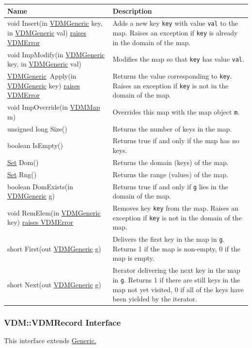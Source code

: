 \documentclass[\pformat,12pt]{article}
\newcommand{\pbs}[1]{\let\temp=\\#1\let\\=\temp}
\newenvironment{interfacetable}{%
  \begin{longtable}{|>{\pbs\raggedright\ttfamily}p{6.6cm}%
                    |>{\pbs\raggedright}p{6.6cm}|} \hline
  \textrm{\bfseries Name} &  \textbf{Description} \\ \hline
  \endhead
  }{\end{longtable}}
\newcommand{\VDMError}{\hyperlink{exception.VDMError}{raises VDMError}}
\newcommand{\VDMGeneric}{\hyperlink{interface.Generic}{VDMGeneric}}
\newcommand{\VDMMap}{\hyperlink{interface.VDMMap}{VDMMap}}
\newcommand{\Set}{\hyperlink{interface.VDMSet}{Set}}
\begin{document}
\begin{interfacetable}
void Insert(in {\VDMGeneric} key, in {\VDMGeneric} val) {\VDMError}
  & Adds a new key \texttt{key} with value \texttt{val} to the
    map. Raises an exception if \texttt{key} is already in the domain
    of the map.
\\ \hline
void ImpModify(in {\VDMGeneric} key, in {\VDMGeneric} val)
  & Modifies the map so that \texttt{key} has value \texttt{val}. 
\\ \hline
{\VDMGeneric}\ Apply(in {\VDMGeneric} key) {\VDMError}
  & Returns the value corresponding to \texttt{key}. Raises an
    exception if \texttt{key} is not in the domain of the map.
\\ \hline
void ImpOverride(in {\VDMMap} m)
  & Overrides this map with the map object \texttt{m}.
\\ \hline
unsigned long Size()
  & Returns the number of keys in the map.
\\ \hline
boolean IsEmpty()
  & Returns true if and only if the map has no keys.
\\ \hline
{\Set} Dom()
  & Returns the domain (keys) of the map.
\\ \hline
{\Set} Rng()
  & Returns the range (values) of the map.
\\ \hline
boolean DomExists(in {\VDMGeneric} g)
  & Returns true if and only if \texttt{g} lies in the domain of the
    map.
\\ \hline
void RemElem(in {\VDMGeneric} key) {\VDMError}
  & Removes key \texttt{key} from the map. Raises an exception if
    \texttt{key} is not in the domain of the map.
\\ \hline
short First(out {\VDMGeneric} g)
  & Delivers the first key in the map in \texttt{g}. Returns 1 if the
    map is non-empty, 0 if the map is empty. 
\\ \hline
short Next(out {\VDMGeneric} g)
  & Iterator delivering the next key in the map in \texttt{g}.
    Returns 1 if there are still keys in the map not yet visited, 0 if
    all of the keys have been yielded by the iterator.
\\ \hline
\end{interfacetable}

\subsubsection{VDM::VDMRecord Interface}
\mbox{}
This interface extends \hyperlink{interface.Generic}{Generic.}
\end{document}
